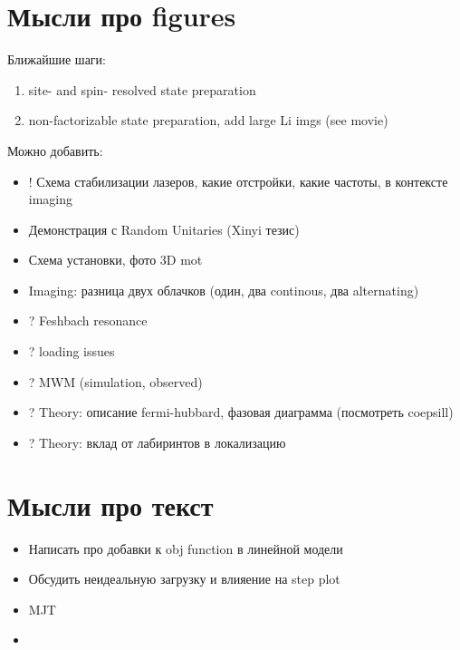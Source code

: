 
\section*{Мысли про figures}


Ближайшие шаги:
\begin{enumerate}
	
	
	\item site- and spin- resolved state preparation

	\item non-factorizable state preparation, add large Li imgs (see movie)


\end{enumerate}

Можно добавить:
\begin{itemize}
	\item ! Схема стабилизации лазеров, какие отстройки, какие частоты, в контексте imaging
	\item Демонстрация с Random Unitaries (Xinyi тезис)
	\item Схема установки, фото 3D mot
	\item Imaging: разница двух облачков (один, два continous, два alternating)
	\item ? Feshbach resonance
	\item ? loading issues
	\item ? MWM (simulation, observed)
	\item ? Theory: описание fermi-hubbard, фазовая диаграмма (посмотреть coepsill)
	\item ? Theory: вклад от лабиринтов в локализацию
\end{itemize}



\section*{Мысли про текст}


\begin{itemize}
	\item Написать про добавки к obj function в линейной модели
	\item Обсудить неидеальную загрузку и влияение на step plot
	\item MJT
	\item 
\end{itemize}